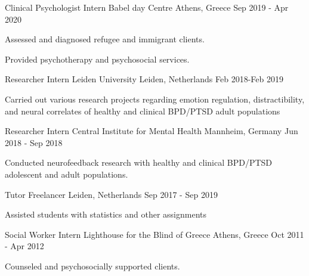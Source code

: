 

\begin{cventries}

\cventry
{Clinical Psychologist Intern} %
{Babel day Centre} %
{Athens, Greece} %
{Sep 2019 - Apr 2020} %
{
\begin{cvitems} %
\item {
Assessed and diagnosed refugee and immigrant clients.
}
\item {
Provided psychotherapy and psychosocial services.
}
\end{cvitems}
}

\cventry
{Researcher Intern}
{Leiden University}
{Leiden, Netherlands}
{Feb 2018-Feb 2019}
{
	\begin{cvitems} %
		\item {Carried out various research projects regarding emotion regulation, distractibility, and neural correlates of healthy and clinical BPD/PTSD adult populations}
	\end{cvitems}
}

\cventry
{Researcher Intern} %
{Central Institute for Mental Health} %
{Mannheim, Germany} %
{Jun 2018 - Sep 2018} %
{
\begin{cvitems} %
\item {Conducted neurofeedback research with healthy and clinical BPD/PTSD adolescent and adult populations.}
\end{cvitems}
}

\cventry
{Tutor} %
{Freelancer} %
{Leiden, Netherlands} %
{Sep 2017 - Sep 2019} %
{
	\begin{cvitems}	
		\item Assisted students with statistics and other assignments
	\end{cvitems}
}

\cventry
{Social Worker Intern} %
{Lighthouse for the Blind of Greece} %
{Athens, Greece} %
{Oct 2011 - Apr 2012} %
{
\begin{cvitems} %
\item {Counseled and psychosocially supported clients.}
\end{cvitems}
}
\end{cventries}
